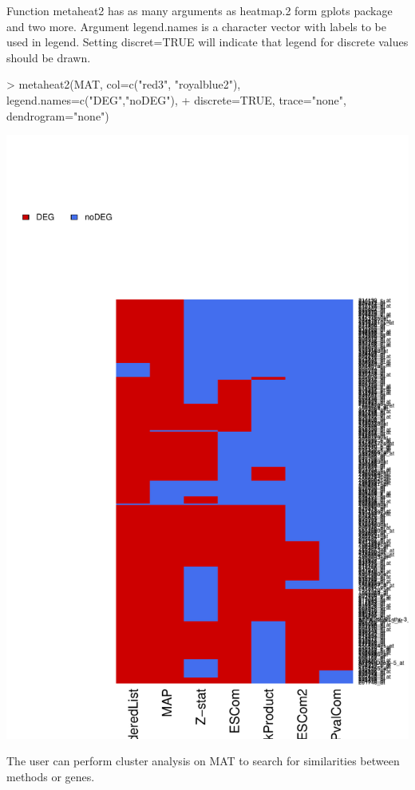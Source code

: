 \documentclass[a4paper]{report}
\begin{document}
 Function {\ttfamily metaheat2} has as many arguments as {\ttfamily heatmap.2} form gplots package and two more. Argument {\ttfamily legend.names} is a character vector with labels to be used in legend. Setting {\ttfamily discret=TRUE} will indicate that legend for discrete values should be drawn. 
\begin{center}
\begin{Schunk}
\begin{Sinput}
> metaheat2(MAT, col=c("red3", "royalblue2"), legend.names=c("DEG","noDEG"), 
+ discrete=TRUE, trace="none", dendrogram="none")
\end{Sinput}
\end{Schunk}
\includegraphics{MAMA_full-069}
\end{center}
The user can perform cluster analysis on {\ttfamily MAT} to search for similarities between methods or genes.\par
\end{document}
